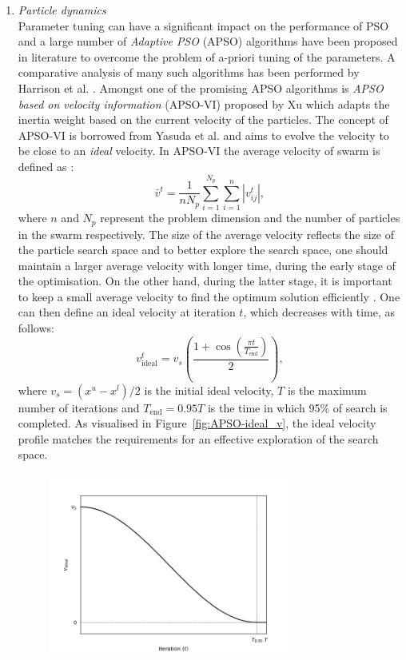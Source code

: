 \begin{enumerate}
		\item \emph{Particle dynamics}\\
			Parameter tuning can have a significant impact on the performance of PSO and a large number of \emph{Adaptive PSO} (APSO) algorithms have been proposed in literature to overcome the problem of a-priori tuning of the parameters. A comparative analysis of many such algorithms has been performed by Harrison et al. \cite{Harrison:2018aa}. Amongst one of the promising APSO algorithms is \emph{APSO based on velocity information} (APSO-VI) proposed by Xu \cite{Xu:2013aa} which adapts the inertia weight based on the current velocity of the particles. The concept of APSO-VI is borrowed from Yasuda et al. \cite{Yasuda:2008aa} and aims to evolve the velocity to be close to an \emph{ideal} velocity. In APSO-VI the average velocity of swarm is defined as \cite{Xu:2013aa}:
			\begin{equation}
				\bar{v}^t = \frac{1}{n N_p} \sum_{i=1}^{N_p} \sum_{i=1}^{n} \left | v_{ij}^t \right |,
			\end{equation}
			where $n$ and $N_p$ represent the problem dimension and the number of particles in the swarm respectively. The size of the average velocity reflects the size of the particle search space and to better explore the search space, one should maintain a larger average velocity with longer time, during the early stage of the optimisation. On the other hand, during the latter stage, it is important to keep a small average velocity to find the optimum solution efficiently \cite{Xu:2013aa}. One can then define an ideal velocity at iteration $t$, which decreases with time, as follows:
			\begin{equation}
				{v}_\text{ideal}^t = v_s \left(\frac{1 + \cos\left (\frac{\pi t}{T_\text{end}} \right )}{2} \right),
			\end{equation}
			where $v_s = (x^u - x^l) / 2$ is the initial ideal velocity, $T$ is the maximum number of iterations and $T_\text{end} = 0.95 T$ is the time in which 95\% of search is completed. As visualised in Figure~\ref{fig:APSO-ideal_v}, the ideal velocity profile matches the requirements for an effective exploration of the search space.
			\begin{figure}[htbp]
				\centering
				\includegraphics[width=0.75\textwidth]{figures/chapter-6/APSO-VI}

\end{figure}
\end{enumerate}
